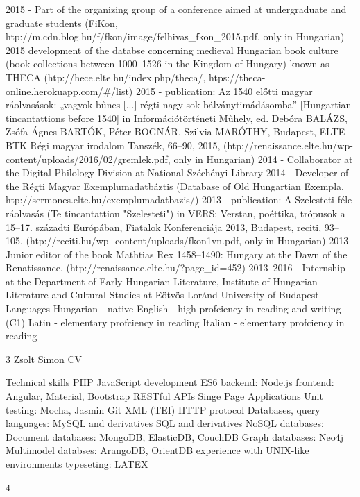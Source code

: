 \documentclass{article}
\begin{document}
      2015 - Part of the organizing group of a conference aimed at undergraduate and
       graduate students
       (FiKon, htp://m.cdn.blog.hu/f/fkon/image/felhivas\_fkon\_2015.pdf, only in
       Hungarian)
      2015 development of the databse concerning medieval Hungarian book culture
       (book collections between 1000–1526 in the Kingdom of Hungary) known as
       THECA (htp://hece.elte.hu/index.php/theca/, htps://theca-
       online.herokuapp.com/\#/list)
      2015 - publication: Az 1540 előtti magyar ráolvasások: „vagyok bűnes [...] régti
       nagy sok bálványtimádásomba” [Hungartian tincantattions before 1540] in
       Információtörténeti Műhely, ed. Debóra BALÁZS, Zsófa Ágnes BARTÓK, Péter
       BOGNÁR, Szilvia MARÓTHY, Budapest, ELTE BTK Régi magyar irodalom
       Tanszék, 66–90, 2015, (htp://renaissance.elte.hu/wp-
       content/uploads/2016/02/gremlek.pdf, only in Hungarian)
      2014 - Collaborator at the Digital Philology Division at National Széchényi
       Library
      2014 - Developer of the Régti Magyar Exemplumadatbáztis (Database of Old
       Hungartian Exempla, htp://sermones.elte.hu/exemplumadatbazis/)
      2013 - publication: A Szelesteti-féle ráolvasás (Te tincantattion "Szelesteti") in
       VERS: Verstan, poéttika, trópusok a 15–17. századti Európában, Fiatalok
       Konferenciája 2013, Budapest, reciti, 93–105. (htp://reciti.hu/wp-
       content/uploads/fkon1vn.pdf, only in Hungarian)
      2013 - Junior editor of the book Mathtias Rex 1458–1490: Hungary at the Dawn
       of the Renatissance, (htp://renaissance.elte.hu/?page\_id=452)
      2013–2016 - Internship at the Department of Early Hungarian Literature,
       Institute of Hungarian Literature and Cultural Studies at Eötvös Loránd
       University of Budapest
Languages
      Hungarian - native
      English - high profciency in reading and writing (C1)
      Latin - elementary profciency in reading
      Italian - elementary profciency in reading




                                              3
Zsolt Simon                                                      CV

Technical skills
      PHP
      JavaScript development
        ES6
        backend: Node.js
        frontend: Angular, Material, Bootstrap
        RESTful APIs
        Singe Page Applications
      Unit testing: Mocha, Jasmin
      Git
      XML (TEI)
      HTTP protocol
      Databases, query languages:
        MySQL and derivatives
        SQL and derivatives
        NoSQL databases:
              Document databases: MongoDB, ElasticDB, CouchDB
              Graph databases: Neo4j
              Multimodel databses: ArangoDB, OrientDB
      experience with UNIX-like environments
      typeseting: LATEΧ




                                        4
\end{document}
